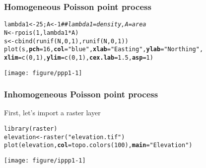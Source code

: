 \documentclass[color=usenames,dvipsnames]{beamer}\usepackage[]{graphicx}\usepackage[]{color}
\makeatletter
\newcommand{\hlnum}[1]{\textcolor[rgb]{0.69,0.494,0}{#1}}%
\newcommand{\hlstr}[1]{\textcolor[rgb]{0.749,0.012,0.012}{#1}}%
\newcommand{\hlcom}[1]{\textcolor[rgb]{0.514,0.506,0.514}{\textit{#1}}}%
\newcommand{\hlopt}[1]{\textcolor[rgb]{0,0,0}{#1}}%
\newcommand{\hlstd}[1]{\textcolor[rgb]{0,0,0}{#1}}%
\newcommand{\hlkwb}[1]{\textcolor[rgb]{0,0.341,0.682}{#1}}%
\newcommand{\hlkwc}[1]{\textcolor[rgb]{0,0,0}{\textbf{#1}}}%
\newcommand{\hlkwd}[1]{\textcolor[rgb]{0.004,0.004,0.506}{#1}}%
\newenvironment{kframe}{%
 \def\at@end@of@kframe{}%
 \ifinner\ifhmode%
  \def\at@end@of@kframe{\end{minipage}}%
  \begin{minipage}{\columnwidth}%
 \fi\fi%
 \def\FrameCommand##1{\hskip\@totalleftmargin \hskip-\fboxsep
 \colorbox{shadecolor}{##1}\hskip-\fboxsep
     \hskip-\linewidth \hskip-\@totalleftmargin \hskip\columnwidth}%
 \MakeFramed {\advance\hsize-\width
   \@totalleftmargin\z@ \linewidth\hsize
   \@setminipage}}%
 {\par\unskip\endMakeFramed%
 \at@end@of@kframe}
\newenvironment{knitrout}{}{} %
\makeatother
\begin{document}
\begin{frame}[fragile]
  \frametitle{Homogeneous Poisson point process}
\begin{knitrout}\footnotesize
{}\color{fgcolor}\begin{kframe}
\begin{alltt}
\hlstd{lambda1} \hlkwb{<-} \hlnum{25}\hlstd{; A} \hlkwb{<-} \hlnum{1}     \hlcom{## lambda1=density, A=area}
\hlstd{N} \hlkwb{<-} \hlkwd{rpois}\hlstd{(}\hlnum{1}\hlstd{, lambda1}\hlopt{*}\hlstd{A)}
\hlstd{s} \hlkwb{<-} \hlkwd{cbind}\hlstd{(}\hlkwd{runif}\hlstd{(N,} \hlnum{0}\hlstd{,} \hlnum{1}\hlstd{),} \hlkwd{runif}\hlstd{(N,} \hlnum{0}\hlstd{,} \hlnum{1}\hlstd{))}
\hlkwd{plot}\hlstd{(s,} \hlkwc{pch}\hlstd{=}\hlnum{16}\hlstd{,} \hlkwc{col}\hlstd{=}\hlstr{"blue"}\hlstd{,} \hlkwc{xlab}\hlstd{=}\hlstr{"Easting"}\hlstd{,} \hlkwc{ylab}\hlstd{=}\hlstr{"Northing"}\hlstd{,}
     \hlkwc{xlim}\hlstd{=}\hlkwd{c}\hlstd{(}\hlnum{0}\hlstd{,}\hlnum{1}\hlstd{),} \hlkwc{ylim}\hlstd{=}\hlkwd{c}\hlstd{(}\hlnum{0}\hlstd{,}\hlnum{1}\hlstd{),} \hlkwc{cex.lab}\hlstd{=}\hlnum{1.5}\hlstd{,} \hlkwc{asp}\hlstd{=}\hlnum{1}\hlstd{)}
\end{alltt}
\end{kframe}

{\centering \texttt{[image: figure/ppp1-1]} 

}



\end{knitrout}
\end{frame}












\begin{frame}[fragile]
  \frametitle{Inhomogeneous Poisson point process}
  First, let's import a raster layer
\begin{knitrout}\footnotesize
{}\color{fgcolor}\begin{kframe}
\begin{alltt}
\hlkwd{library}\hlstd{(raster)}
\hlstd{elevation} \hlkwb{<-} \hlkwd{raster}\hlstd{(}\hlstr{"elevation.tif"}\hlstd{)}
\hlkwd{plot}\hlstd{(elevation,} \hlkwc{col}\hlstd{=}\hlkwd{topo.colors}\hlstd{(}\hlnum{100}\hlstd{),} \hlkwc{main}\hlstd{=}\hlstr{"Elevation"}\hlstd{)}
\end{alltt}
\end{kframe}

{\centering \texttt{[image: figure/ippp1-1]} 

}



\end{knitrout}
\end{frame}
\end{document}
